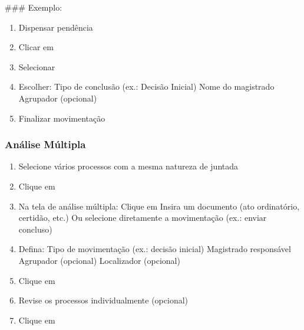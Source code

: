 \documentclass[letterpaper,10pt,brazil]{sphinxmanual}
\begin{document}
\sphinxAtStartPar
\#\#\# Exemplo:
\begin{enumerate}
%
\item {} 
\sphinxAtStartPar
Dispensar pendência

\item {} 
\sphinxAtStartPar
Clicar em 

\item {} 
\sphinxAtStartPar
Selecionar 

\item {} 
\sphinxAtStartPar
Escolher:
\sphinxhyphen{} Tipo de conclusão (ex.: Decisão Inicial)
\sphinxhyphen{} Nome do magistrado
\sphinxhyphen{} Agrupador (opcional)

\item {} 
\sphinxAtStartPar
Finalizar movimentação

\end{enumerate}


\subsubsection{Análise Múltipla}
\label{\detokenize{projud_06_analisejuntada_multiplaeunitaria:analise-multipla}}\begin{enumerate}
%
\item {} 
\sphinxAtStartPar
Selecione vários processos com a mesma natureza de juntada

\item {} 
\sphinxAtStartPar
Clique em 

\item {} 
\sphinxAtStartPar
Na tela de análise múltipla:
\sphinxhyphen{} Clique em 
\sphinxhyphen{} Insira um documento (ato ordinatório, certidão, etc.)
\sphinxhyphen{} Ou selecione diretamente a movimentação (ex.: enviar concluso)

\item {} 
\sphinxAtStartPar
Defina:
\sphinxhyphen{} Tipo de movimentação (ex.: decisão inicial)
\sphinxhyphen{} Magistrado responsável
\sphinxhyphen{} Agrupador (opcional)
\sphinxhyphen{} Localizador (opcional)

\item {} 
\sphinxAtStartPar
Clique em 

\item {} 
\sphinxAtStartPar
Revise os processos individualmente (opcional)

\item {} 
\sphinxAtStartPar
Clique em 

\end{enumerate}
\end{document}
